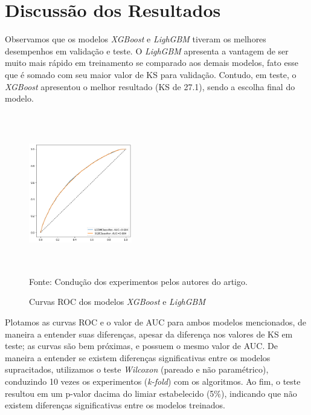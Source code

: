 \section{Discussão dos Resultados}

Observamos que os modelos \textit{XGBoost} e \textit{LighGBM} tiveram os melhores desempenhos em validação e teste. O \textit{LighGBM} apresenta a vantagem de ser muito mais rápido em treinamento se comparado aos demais modelos, fato esse que é somado com seu maior valor de KS para validação. Contudo, em teste, o \textit{XGBoost} apresentou o melhor resultado (KS de 27.1), sendo a escolha final do modelo.

\begin{figure}[h]
\centering
\caption{\label{figure:figura3}Curvas ROC dos modelos \textit{XGBoost} e \textit{LighGBM}}
  \includegraphics[width=0.4\textwidth,height=70mm]{assets/auc_roc.png}
  \\ Fonte: Condução dos experimentos pelos autores do artigo.
\end{figure}

Plotamos as curvas ROC e o valor de AUC para ambos modelos mencionados, de maneira a entender suas diferenças, apesar da diferença nos valores de KS em teste; as curvas são bem próximas, e possuem o mesmo valor de AUC. De maneira a entender se existem diferenças significativas entre os modelos supracitados, utilizamos o teste \textit{Wilcoxon} (pareado e não paramétrico), conduzindo 10 vezes os experimentos (\textit{k-fold}) com os algoritmos. Ao fim, o teste resultou em um p-valor dacima do limiar estabelecido (5\%), indicando que não existem diferenças significativas entre os modelos treinados.